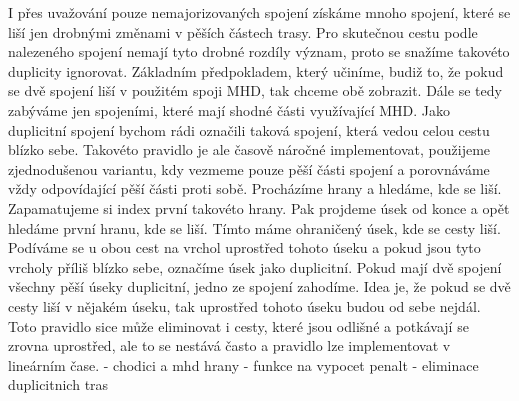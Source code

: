 I přes uvažování pouze nemajorizovaných spojení získáme mnoho spojení, které se
liší jen drobnými změnami v pěších částech trasy. Pro skutečnou cestu podle
nalezeného spojení nemají tyto drobné rozdíly význam, proto se snažíme takovéto
duplicity ignorovat. Základním předpokladem, který učiníme, budiž to, že pokud
se dvě spojení liší v použitém spoji MHD, tak chceme obě zobrazit. Dále se tedy
zabýváme jen spojeními, které mají shodné části využívající MHD. Jako duplicitní
spojení bychom rádi označili taková spojení, která vedou celou cestu blízko
sebe. Takovéto pravidlo je ale časově náročné implementovat, použijeme
zjednodušenou variantu, kdy vezmeme pouze pěší části spojení a porovnáváme vždy
odpovídající pěší části proti sobě. Procházíme hrany a hledáme, kde se liší.
Zapamatujeme si index první takovéto hrany. Pak projdeme úsek od konce a opět
hledáme první hranu, kde se liší. Tímto máme ohraničený úsek, kde se cesty liší.
Podíváme se u obou cest na vrchol uprostřed tohoto úseku a pokud jsou tyto
vrcholy příliš blízko sebe, označíme úsek jako duplicitní. Pokud mají dvě
spojení všechny pěší úseky duplicitní, jedno ze spojení zahodíme. Idea je, že
pokud se dvě cesty liší v nějakém úseku, tak uprostřed tohoto úseku budou od
sebe nejdál. Toto pravidlo sice může eliminovat i cesty, které jsou odlišné a
potkávají se zrovna uprostřed, ale to se nestává často a pravidlo lze
implementovat v lineárním čase.
    - chodici a mhd hrany
    - funkce na vypocet penalt
    - eliminace duplicitnich tras

